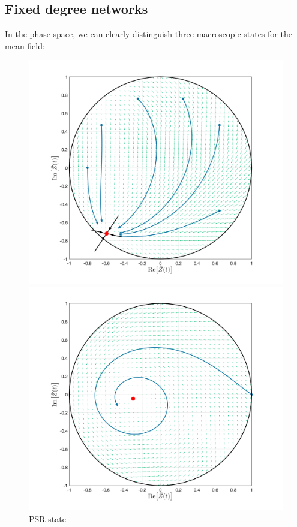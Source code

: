 \subsection{Fixed degree networks}
In the phase space, we can clearly distinguish three macroscopic states for the mean field:
\begin{figure}[H]
  \includegraphics[width=\linewidth, trim={2cm 1cm 2cm 1.5cm },clip]{../Figures/MFRPSR.png}
  \caption{PSR state}\label{fig:MFRPSR}
\endminipage\hfill
{}
  \includegraphics[width=\linewidth, trim={2cm 1cm 2cm 1.5cm },clip]{../Figures/MFRPSS.png}

\end{figure}
